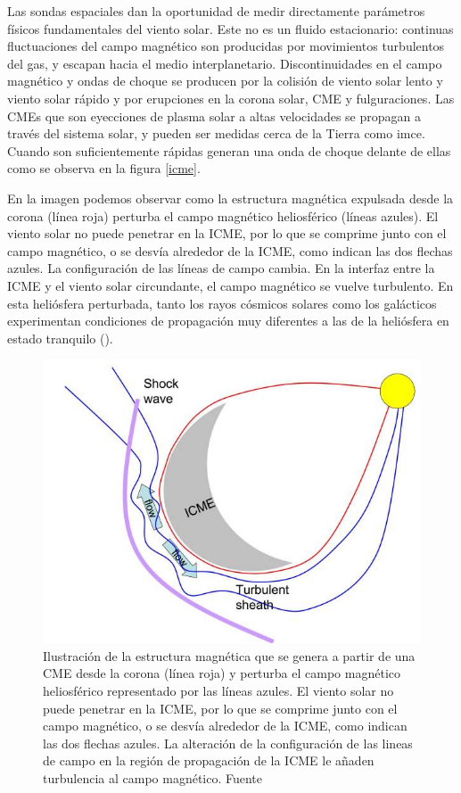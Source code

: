 Las sondas espaciales dan la oportunidad de medir directamente parámetros físicos fundamentales del viento solar. Este no es un fluido estacionario: continuas fluctuaciones del campo magnético son producidas por movimientos turbulentos del gas, y escapan hacia el medio interplanetario. Discontinuidades en el campo magnético y ondas de choque se producen por la colisión de viento solar lento y viento solar rápido y por erupciones en la corona solar, \gls{CME} y fulguraciones. Las CMEs que son eyecciones de plasma solar a altas velocidades se propagan a través del sistema solar, y pueden ser medidas cerca de la Tierra como \gls{imce}. Cuando son suficientemente rápidas generan una onda de choque delante de ellas como se observa en la figura \ref{icme}. 

En la imagen podemos observar como la estructura magnética expulsada desde la corona (línea roja) perturba el campo magnético heliosférico (líneas azules). El viento solar no puede penetrar en la ICME, por lo que se comprime junto con el campo magnético, o se desvía alrededor de la ICME, como indican las dos flechas azules. La configuración de las líneas de campo cambia. En la interfaz entre la ICME y el viento solar circundante, el campo magnético se vuelve turbulento. En esta heliósfera perturbada, tanto los rayos cósmicos solares como los galácticos experimentan condiciones de propagación muy diferentes a las de la heliósfera en estado tranquilo (\cite{NMDB}).
\begin{figure}[H]
    \centering
    \includegraphics[width=0.5\linewidth]{Figs/Dessin_ICME_sm_0.jpg}
    \caption{Ilustración de la estructura magnética que se genera a partir de una CME desde la corona (línea roja) y perturba el campo magnético heliosférico representado por las líneas azules. El viento solar no puede penetrar en la ICME, por lo que se comprime junto con el campo magnético, o se desvía alrededor de la ICME, como indican las dos flechas azules. La alteración de la configuración de las lineas de campo en la región de propagación de la ICME le añaden turbulencia al campo magnético. Fuente \cite{NMDB}}
    \label{imce}
\end{figure}
